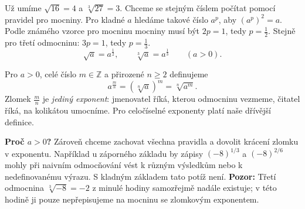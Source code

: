 \documentclass[11pt,a4paper]{article}
\begin{document}

Už umíme $\sqrt{16}=4$ a $\sqrt[3]{27}=3$. Chceme se stejným číslem
počítat pomocí pravidel pro mocniny. Pro kladné $a$ hledáme takové číslo
$a^p$, aby $(a^p)^2=a$. Podle známého vzorce pro mocninu mocniny
musí být $2p=1$, tedy $p=\tfrac12$. Stejně pro třetí odmocninu:
$3p=1$, tedy $p=\tfrac13$.
\[
\sqrt a=a^{\frac12},\qquad \sqrt[3]a=a^{\frac13}\qquad (a>0).
\]

\begin{definiceBox}[title={Definice: mocnina s racionálním exponentem}]
Pro $a>0$, celé číslo $m\in\mathbb Z$ a přirozené $n\ge2$ definujeme
\[
\boxed{\displaystyle a^{\frac mn}=(\sqrt[n]{a})^m=\sqrt[n]{a^m}.}
\]
Zlomek $\frac mn$ je \emph{jediný exponent}: jmenovatel říká, kterou
odmocninu vezmeme, čitatel říká, na kolikátou umocníme.
Pro celočíselné exponenty platí naše dřívější definice.
\end{definiceBox}
\textbf{Proč $a>0$?} Zároveň chceme zachovat všechna pravidla a dovolit
krácení zlomku v exponentu. Například u záporného základu by zápisy
$(-8)^{1/3}$ a $(-8)^{2/6}$ mohly při naivním odmocňování vést k různým
výsledkům nebo k nedefinovanému výrazu. S kladným základem tato potíž není.
\textbf{Pozor:} Třetí odmocnina $\sqrt[3]{-8}=-2$ z minulé hodiny
samozřejmě nadále existuje; v této hodině ji pouze nepřepisujeme
na mocninu se zlomkovým exponentem.
\end{document}
